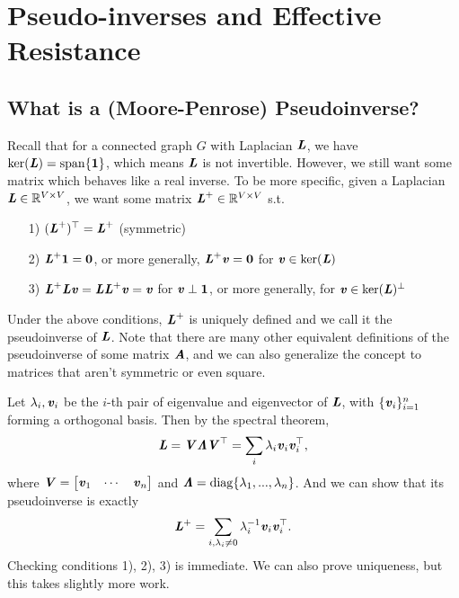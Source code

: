 \chapter{Pseudo-inverses and Effective Resistance}
\label{cha:pinver}



%
\sloppy

\section{What is a (Moore-Penrose) Pseudoinverse?}
Recall that for a connected graph $G$ with Laplacian $\LL$, we have $\ker(\LL)=\Span\{\vecone\}$, which means $\LL$ is not invertible. However, we still want some matrix which behaves like a real inverse. To be more specific, given a Laplacian $\LL\in\R^{V\times V}$, we want some matrix $\LL^{\pinv}\in\R^{V\times V}$ s.t.\
\begin{enumerate}
	\item[1)] $(\LL^{\pinv})^\trp = \LL^\pinv$ (symmetric)
	\item[2)] $\LL^{\pinv}\matone = \veczero$, or more generally, $\LL^{\pinv}\vv=\veczero$ for $\vv\in\ker(\LL)$
	\item[3)] $\LL^{\pinv}\LL\vv = \LL\LL^{\pinv}\vv = \vv$ for $\vv\perp\matone$, or more generally, for $\vv\in\ker(\LL)^\perp$
\end{enumerate}
Under the above conditions, $\LL^{\pinv}$ is uniquely defined and we
call it the pseudoinverse of $\LL$. Note that there are many other
equivalent definitions of the pseudoinverse of some matrix $\AA$,
and we can also generalize the concept to matrices that aren't
symmetric or even square.

Let $\lambda_i, \vv_i$ be the $i$-th pair of eigenvalue and eigenvector of $\LL$, with $\{\vv_i\}_{i=1}^n$ forming a orthogonal basis. Then by the spectral theorem,
\[ \LL = \VV\LLambda\VV^\trp = \sum_i \lambda_i\vv_i\vv_i^\trp, \]
where $\VV = \begin{bmatrix} \vv_1 & \cdots & \vv_n \end{bmatrix}$ and $\LLambda = \diag\{\lambda_1,...,\lambda_n\}$. And we can show that its pseudoinverse is exactly
\[ \LL^{\pinv} = \sum_{i,\lambda_i\neq0} \lambda_i^{-1}\vv_i\vv_i^\trp. \]
Checking conditions 1), 2), 3) is immediate.
We can also prove uniqueness, but this takes slightly more work.

